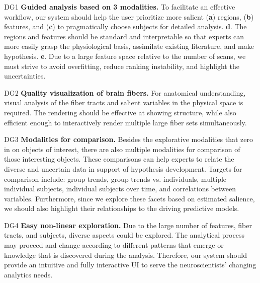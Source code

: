 \begin{asparadesc}

    \item[DG1] \textbf{Guided analysis based on 3 modalities.}
   To facilitate an effective workflow, our system should help the user prioritize more salient (\textbf{a}) regions, (\textbf{b}) features, and (\textbf{c}) to pragmatically choose subjects for detailed analysis. \textbf{d}. The regions and features should be standard and interpretable so that experts can more easily grasp the physiological basis, assimilate existing literature, and make hypothesis. \textbf{e}. Due to a large feature space relative to the number of scans, we must strive to avoid overfitting, reduce ranking instability, and highlight the uncertainties.
    

	\item[DG2] \textbf{Quality visualization of brain fibers.}
	For anatomical understanding, visual analysis of the fiber tracts and salient variables in the physical space is required. The rendering should be effective at showing structure, while also efficient enough to interactively render multiple large fiber sets simultaneously.
	
	\item[DG3] \textbf{Modalities for comparison.} Besides the explorative modalities that zero in on objects of interest, there are also multiple modalities for comparison of those interesting objects. These comparisons can help experts to relate the diverse and uncertain data in support of hypothesis development. 
	Targets for comparison include: group trends, group trends vs. individuals, multiple individual subjects, individual subjects over time, and correlations between variables. Furthermore, since we explore these facets based on estimated salience, we should also highlight their relationships to the driving predictive models. 

    \item[DG4] \textbf{Easy non-linear exploration.}
    Due to the large number of features, fiber tracts, and subjects, 
    diverse aspects could be explored. 
    The analytical process may proceed and change according to different patterns that emerge or knowledge that is discovered during the analysis. 
    Therefore, our system should provide an intuitive and fully interactive UI to serve the neuroscientists' changing analytics needs.


\end{asparadesc}
